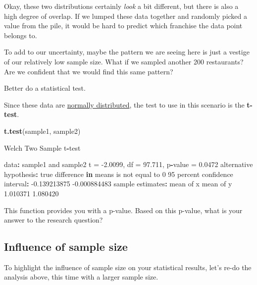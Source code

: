 \documentclass[
]{book}
\newenvironment{Shaded}{\begin{snugshade}}{\end{snugshade}}
\newcommand{\ControlFlowTok}[1]{\textcolor[rgb]{0.13,0.29,0.53}{\textbf{#1}}}
\newcommand{\DecValTok}[1]{\textcolor[rgb]{0.00,0.00,0.81}{#1}}
\newcommand{\FloatTok}[1]{\textcolor[rgb]{0.00,0.00,0.81}{#1}}
\newcommand{\KeywordTok}[1]{\textcolor[rgb]{0.13,0.29,0.53}{\textbf{#1}}}
\newcommand{\NormalTok}[1]{#1}
\newcommand{\OperatorTok}[1]{\textcolor[rgb]{0.81,0.36,0.00}{\textbf{#1}}}
\newcommand{\StringTok}[1]{\textcolor[rgb]{0.31,0.60,0.02}{#1}}
\begin{document}
Okay, these two distributions certainly \emph{look} a bit different, but there is also a high degree of overlap. If we lumped these data together and randomly picked a value from the pile, it would be hard to predict which franchise the data point belongs to.

To add to our uncertainty, maybe the pattern we are seeing here is just a vestige of our relatively low sample size. What if we sampled another 200 restaurants? Are we confident that we would find this same pattern?

Better do a statistical test.

Since these data are \href{https://www.mathsisfun.com/data/standard-normal-distribution.html}{normally distributed}, the test to use in this scenario is the \textbf{t-test}.

\begin{Shaded}
\begin{Highlighting}[]
\KeywordTok{t.test}\NormalTok{(sample1, }
\NormalTok{       sample2)}

\NormalTok{    Welch Two Sample t}\OperatorTok{-}\NormalTok{test}

\NormalTok{data}\OperatorTok{:}\StringTok{  }\NormalTok{sample1 and sample2}
\NormalTok{t =}\StringTok{ }\FloatTok{-2.0099}\NormalTok{, df =}\StringTok{ }\FloatTok{97.711}\NormalTok{, p}\OperatorTok{-}\NormalTok{value =}\StringTok{ }\FloatTok{0.0472}
\NormalTok{alternative hypothesis}\OperatorTok{:}\StringTok{ }\NormalTok{true difference }\ControlFlowTok{in}\NormalTok{ means is not equal to }\DecValTok{0}
\DecValTok{95}\NormalTok{ percent confidence interval}\OperatorTok{:}
\StringTok{ }\FloatTok{-0.139213875} \FloatTok{-0.000884483}
\NormalTok{sample estimates}\OperatorTok{:}
\NormalTok{mean of x mean of y }
 \FloatTok{1.010371}  \FloatTok{1.080420} 
\end{Highlighting}
\end{Shaded}

This function provides you with a p-value. Based on this p-value, what is your answer to the research question?

\hypertarget{influence-of-sample-size}{%
\subsection*{Influence of sample size}\label{influence-of-sample-size}}

To highlight the influence of sample size on your statistical results, let's re-do the analysis above, this time with a larger sample size.
\end{document}
